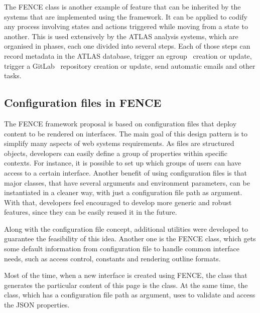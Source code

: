 The FENCE  class is another example of feature that can be inherited by the systems that are implemented using the framework.
It can be applied to codify any process involving states and actions triggered while moving from a state to another.
This is used extensively by the ATLAS analysis systems, which are organised in phases, each one divided into several steps.
Each of those steps can record metadata in the ATLAS database, trigger an egroup~\cite{egroups} creation or update, trigger a  GitLab~\cite{gitlab} repository creation or update, send automatic emails and other tasks.


\subsection{Configuration files in FENCE}%
\label{sec:Configuration_files_in_FENCE}

The FENCE framework proposal is based on configuration files that deploy content to be rendered on interfaces.
The main goal of this design pattern is to simplify many aspects of web systems requirements.
As  files are structured objects, developers can easily define a group of properties within specific contexts.
For instance, it is possible to set up which groups of users can have access to a certain interface.
Another benefit of using configuration files is that major classes, that have several arguments and environment parameters, can be instantiated in a cleaner way, with just a configuration file path as argument.
With that, developers feel encouraged to develop more generic and robust features, since they can be easily reused it in the future.

Along with the configuration file concept, additional utilities were developed to guarantee the feasibility of this idea.
Another one is the FENCE  class, which gets some default information from configuration file to handle common interface needs, such as access control, constants and rendering outline formats.

Most of the time, when a new interface is created using FENCE, the class that generates the particular content of this page is  the  class.
At the same time, the  class, which has a configuration file path as argument, uses  to validate and access the JSON properties.

